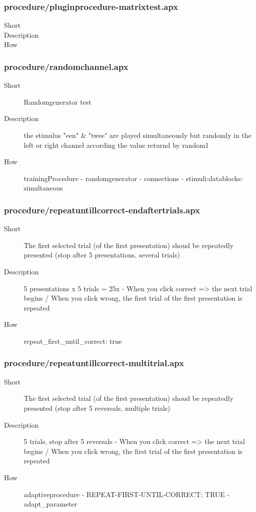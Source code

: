 \subsubsection{procedure/pluginprocedure-matrixtest.apx}
\begin{description}
\item[Short] 
\item[Description] 
\item[How] 
\end{description}

\subsubsection{procedure/randomchannel.apx}
\begin{description}
\item[Short] 
 Randomgenerator test
\item[Description] 
 the stimulus "een" \& "twee" are played simultaneously but randomly in the left or right channel according the value returnd by random1
\item[How] 
 trainingProcedure - randomgenerator - connections - stimuli:datablocks: simultaneous
\end{description}

\subsubsection{procedure/repeatuntillcorrect-endaftertrials.apx}
\begin{description}
\item[Short] 
 The first selected trial (of the first presentation) shoud be repeatedly presented (stop after 5 presentations, several trials)
\item[Description] 
 5 presentations x 5 trials = 25x - When you click correct =\textgreater{} the next trial begins / When you click wrong, the first trial of the first presentation is repeated
\item[How] 
 repeat\_first\_until\_correct: true
\end{description}

\subsubsection{procedure/repeatuntillcorrect-multitrial.apx}
\begin{description}
\item[Short] 
 The first selected trial (of the first presentation) shoud be repeatedly presented (stop after 5 reversals, multiple trials)
\item[Description] 
 5 trials, stop after 5 reversals - When you click correct =\textgreater{} the next trial begins / When you click wrong, the first trial of the first presentation is repeated
\item[How] 
 adaptiveprocedure - REPEAT-FIRST-UNTIL-CORRECT: TRUE - adapt\_parameter
\end{description}

